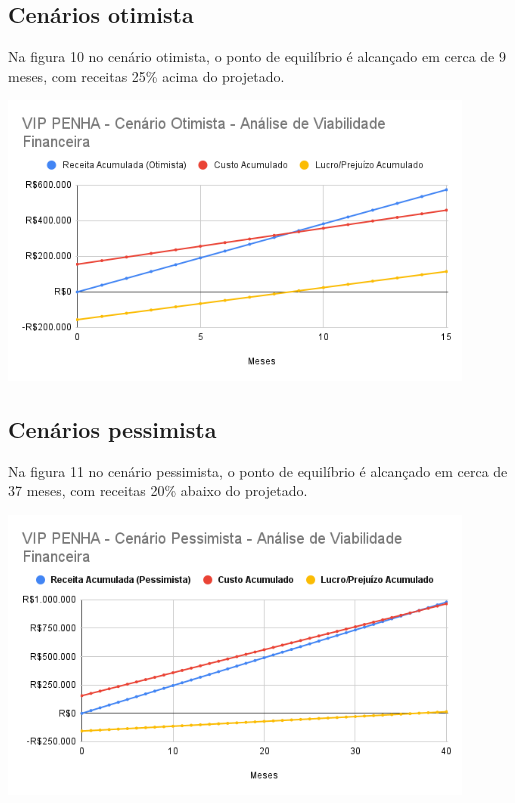 \documentclass[
	12pt,				%
	openany,			%
	twoside,			%
	a4paper,			%
	english,			%
	brazil				%
	]{abntex2}
\begin{document}
\subsection{Cenários otimista}
Na figura 10 no cenário otimista, o ponto de equilíbrio é alcançado em cerca de 9 meses, com receitas 25\% acima do projetado.
\begin{center}
  \includegraphics[width=0.9\textwidth]{Figuras/CenarioOtimista.png}
\end{center}

\subsection{Cenários pessimista}
Na figura 11 no cenário pessimista, o ponto de equilíbrio é alcançado em cerca de 37 meses, com receitas 20\% abaixo do projetado.
\begin{center}
  \includegraphics[width=0.9\textwidth]{Figuras/CenarioPessimista.png}
\end{center}
\end{document}
